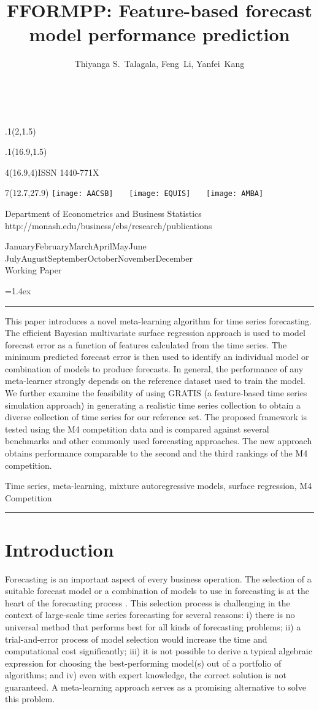 \documentclass[11pt,a4paper,]{article}
\title{FFORMPP: Feature-based forecast model performance prediction}
\author{Thiyanga S.~Talagala, Feng~Li, Yanfei~Kang}
\date{\sf\Date~\Month~\Year}
\makeatletter
\def\Date{\number\day}
\def\Month{\ifcase\month\or
 January\or February\or March\or April\or May\or June\or
 July\or August\or September\or October\or November\or December\fi}
\def\Year{\number\year}
\def\showjel{{\large\textsf{\textbf{JEL classification:}}~\@jel}}
\def\cover{{\sffamily\setcounter{page}{0}
        \thispagestyle{empty}
        \placefig{2}{1.5}{width=5cm}{monash2}
        \placefig{16.9}{1.5}{width=2.1cm}{MBusSchool}
        \begin{textblock}{4}(16.9,4)ISSN 1440-771X\end{textblock}
        \begin{textblock}{7}(12.7,27.9)\hfill
        \texttt{[image: AACSB]}~~~
        \texttt{[image: EQUIS]}~~~
        \texttt{[image: AMBA]}
        \end{textblock}
        \vspace*{2cm}
        \begin{center}\Large
        Department of Econometrics and Business Statistics\\[.5cm]
        \footnotesize http://monash.edu/business/ebs/research/publications
        \end{center}\vspace{2cm}
        \begin{center}
        \fbox{\parbox{14cm}{\begin{onehalfspace}\centering\Huge\vspace*{0.3cm}
                \textsf{\textbf{\expandafter{\@title}}}\vspace{1cm}\par
                \LARGE\@author\end{onehalfspace}
        }}
        \end{center}
        \vfill
                \begin{center}\Large
                \Month~\Year\\[1cm]
                Working Paper \@wp
        \end{center}\vspace*{2cm}}}
\def\pageone{{\sffamily\setstretch{1}%
        \thispagestyle{empty}%
        \vbox to \textheight{%
        \raggedright\baselineskip=1.2cm
     {\fontsize{24.88}{30}\sffamily\textbf{\expandafter{\@title}}}
        \vspace{2cm}\par
        \hspace{1cm}\parbox{14cm}{\sffamily\large\@addresses}\vspace{1cm}\vfill
        \hspace{1cm}{\large\Date~\Month~\Year}\\[1cm]
        \hspace{1cm}\showjel\vss}}}
\def\blindtitle{{\sffamily
     \thispagestyle{plain}\raggedright\baselineskip=1.2cm
     {\fontsize{24.88}{30}\sffamily\textbf{\expandafter{\@title}}}\vspace{1cm}\par
        }}
\def\titlepage{{\cover\newpage\pageone\newpage\blindtitle}}
\let\maketitle\titlepage
\newenvironment{keywords}{\par\vspace{0.5cm}\noindent{\sffamily\textbf{Keywords:}}}{\vspace{0.25cm}\par\hrule\vspace{0.5cm}\par}
\renewenvironment{abstract}{\begin{minipage}{\textwidth}\parskip=1.4ex\noindent
\hrule\vspace{0.1cm}\par{\sffamily\textbf{\abstractname}}\newline}
  {\end{minipage}}
\def\placefig#1#2#3#4{\begin{textblock}{.1}(#1,#2)\rlap{\texttt{[image: \#4]}}\end{textblock}}
\makeatother
\begin{document}
\maketitle
\begin{abstract}
This paper introduces a novel meta-learning algorithm for time series forecasting. The efficient Bayesian multivariate surface regression approach is used to model forecast error as a function of features calculated from the time series. The minimum predicted forecast error is then used to identify an individual model or combination of models to produce forecasts. In general, the performance of any meta-learner strongly depends on the reference dataset used to train the model. We further examine the feasibility of using GRATIS (a feature-based time series simulation approach) in generating a realistic time series collection to obtain a diverse collection of time series for our reference set. The proposed framework is tested using the M4 competition data and is compared against several benchmarks and other commonly used forecasting approaches. The new approach obtains performance comparable to the second and the third rankings of the M4 competition.
\end{abstract}
\begin{keywords}
Time series, meta-learning, mixture autoregressive models, surface regression, M4 Competition
\end{keywords}

\hypertarget{intro}{%
\section{Introduction}\label{intro}}

Forecasting is an important aspect of every business operation. The selection of a suitable forecast model or a combination of models to use in forecasting is at the heart of the forecasting process \autocite{tashman1991automatic}. This selection process is challenging in the context of large-scale time series forecasting for several reasons: i) there is no universal method that performs best for all kinds of forecasting problems; ii) a trial-and-error process of model selection would increase the time and computational cost significantly; iii) it is not possible to derive a typical algebraic expression for choosing the best-performing model(s) out of a portfolio of algorithms; and iv) even with expert knowledge, the correct solution is not guaranteed. A meta-learning approach serves as a promising alternative to solve this problem.
\end{document}

